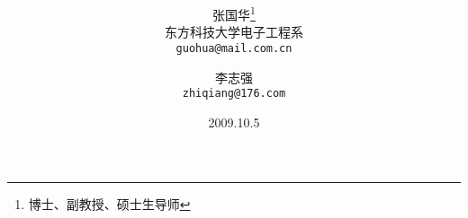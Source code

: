 \documentclass{book}
\begin{document}
\title{%
\vspace{-30mm}\heiti{}\vspace{9mm}
}
\author{%
张国华\thanks{博士、副教授、硕士生导师}
\\[2mm]
东方科技大学电子工程系\\
\texttt{guohua@mail.com.cn}
\and 李志强
\\[2mm]
\texttt{zhiqiang@176.com}
}
\date{2009.10.5}
\maketitle
\end{document}
